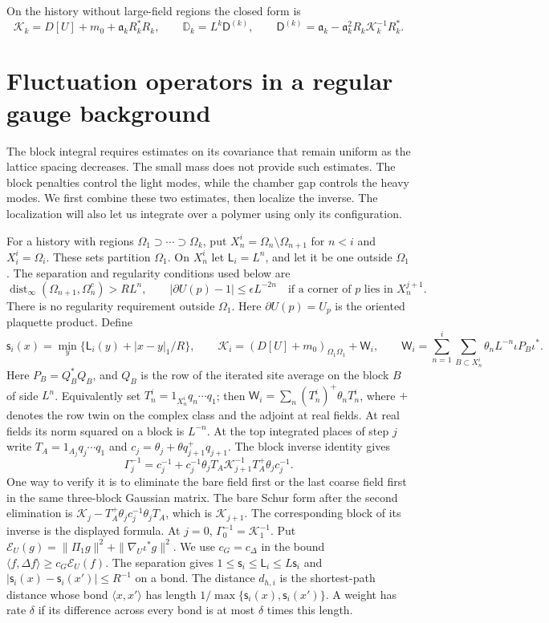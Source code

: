 \documentclass[11pt,letterpaper,reqno]{amsart}
\theoremstyle{definition}
\theoremstyle{remark}
\begin{document}
On the history without large-field regions the closed form is
\[
 \mathcal K_k=D[U]+m_0+\mathfrak a_kR_k^*R_k,
 \qquad
 \mathbb D_k=L^k\mathsf D^{(k)},\qquad
 \mathsf D^{(k)}=\mathfrak a_k-
       \mathfrak a_k^2R_k\mathcal K_k^{-1}R_k^*.
\]

\section{Fluctuation operators in a regular gauge background}\label{sec:qcd-regular-operators}

The block integral requires estimates on its covariance that remain
uniform as the lattice spacing decreases.  The small mass does not
provide such estimates.  The block penalties control the light modes,
while the chamber gap controls the heavy modes.  We first combine these
two estimates, then localize the inverse.  The localization will also
let us integrate over a polymer using only its configuration.

For a history with regions $\Omega_1\supset\cdots\supset\Omega_k$,
put $X_n^i=\Omega_n\setminus\Omega_{n+1}$ for $n<i$ and
$X_i^i=\Omega_i$.  These sets partition $\Omega_1$.  On $X_n^i$
let $\mathsf L_i=L^n$, and let it be one outside $\Omega_1$.
The separation and regularity conditions used below are
\[
 \operatorname{dist}_\infty(\Omega_{n+1},\Omega_n^c)>RL^n,
 \qquad
 |\partial U(p)-1|\le\epsilon L^{-2n}
 \quad\text{if a corner of }p\text{ lies in }X_n^{j+1}.
\]
There is no regularity requirement outside $\Omega_1$.
Here $\partial U(p)=U_p$ is the oriented plaquette product.
Define
\[
 \mathsf s_i(x)=\min_y\{\mathsf L_i(y)+|x-y|_1/R\},\qquad
 \mathcal K_i=(D[U]+m_0)_{\Omega_1\Omega_1}+\mathsf W_i,
 \qquad
 \mathsf W_i=\sum_{n=1}^i\sum_{B\subset X_n^i}
                    \theta_nL^{-n}\iota P_B\iota^*.
\]
Here $P_B=Q_B^*Q_B$, and $Q_B$ is the row of the iterated site
average on the block $B$ of side $L^n$.
Equivalently set $T_n^i=1_{X_n^i}q_n\cdots q_1$;
then $\mathsf W_i=\sum_n(T_n^i)^+\theta_nT_n^i$,
where $+$ denotes the row twin on the complex class and
the adjoint at real fields.  At real fields its norm squared on a block
is $L^{-n}$.  At the top integrated places of step $j$
write $T_A=1_{A_j}q_j\cdots q_1$ and
$c_j=\theta_j+\theta q_{j+1}^+q_{j+1}$.  The block
inverse identity gives
\[
 \Gamma_j^{-1}=c_j^{-1}+c_j^{-1}\theta_jT_A
           \mathcal K_{j+1}^{-1}T_A^+\theta_jc_j^{-1}.
\]
One way to verify it is to eliminate the bare field
first or the last coarse field first in the same
three-block Gaussian matrix.  The bare Schur form
after the second elimination is
$\mathcal K_j-T_A^+\theta_jc_j^{-1}\theta_jT_A$,
which is $\mathcal K_{j+1}$.  The corresponding block
of its inverse is the displayed formula.  At $j=0$,
$\Gamma_0^{-1}=\mathcal K_1^{-1}$.
Put $\mathcal E_U(g)=\|\Pi_1g\|^2+\|\nabla_U\iota^*g\|^2$.
We use $c_G=c_\Delta$ in the bound
$\langle f,\Delta f\rangle\ge c_G\mathcal E_U(f)$.
The separation gives
$1\le\mathsf s_i\le\mathsf L_i\le L\mathsf s_i$ and
$|\mathsf s_i(x)-\mathsf s_i(x')|\le R^{-1}$ on a bond.
The distance $d_{h,i}$ is the shortest-path distance
whose bond $\langle x,x'\rangle$ has length
$1/\max\{\mathsf s_i(x),\mathsf s_i(x')\}$.
A weight has rate $\delta$ if its difference across
every bond is at most $\delta$ times this length.
\end{document}
